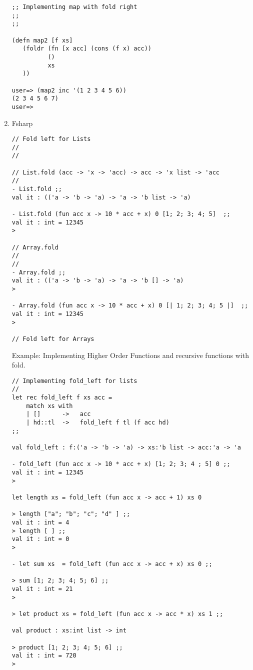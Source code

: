 \documentclass[11pt]{article}
\begin{document}
\begin{enumerate}
\begin{verbatim}
;; Implementing map with fold right 
;;
;;

(defn map2 [f xs] 
   (foldr (fn [x acc] (cons (f x) acc)) 
          ()
          xs
   ))

user=> (map2 inc '(1 2 3 4 5 6))
(2 3 4 5 6 7)
user=>
\end{verbatim}

\item Fsharp
\label{sec-1-9-4-5}

\begin{verbatim}
// Fold left for Lists 
//
//

// List.fold (acc -> 'x -> 'acc) -> acc -> 'x list -> 'acc
//
- List.fold ;;  
val it : (('a -> 'b -> 'a) -> 'a -> 'b list -> 'a) 

- List.fold (fun acc x -> 10 * acc + x) 0 [1; 2; 3; 4; 5]  ;;
val it : int = 12345
>

// Array.fold 
// 
//
- Array.fold ;;  
val it : (('a -> 'b -> 'a) -> 'a -> 'b [] -> 'a) 
> 

- Array.fold (fun acc x -> 10 * acc + x) 0 [| 1; 2; 3; 4; 5 |]  ;;
val it : int = 12345
> 

// Fold left for Arrays
\end{verbatim}


Example: Implementing Higher Order Functions and recursive functions
with fold.

\begin{verbatim}
// Implementing fold_left for lists 
//
let rec fold_left f xs acc =
    match xs with 
    | []      ->   acc 
    | hd::tl  ->   fold_left f tl (f acc hd)
;;

val fold_left : f:('a -> 'b -> 'a) -> xs:'b list -> acc:'a -> 'a

- fold_left (fun acc x -> 10 * acc + x) [1; 2; 3; 4 ; 5] 0 ;; 
val it : int = 12345
> 

let length xs = fold_left (fun acc x -> acc + 1) xs 0

> length ["a"; "b"; "c"; "d" ] ;;
val it : int = 4
> length [ ] ;;                  
val it : int = 0
> 

- let sum xs  = fold_left (fun acc x -> acc + x) xs 0 ;;

> sum [1; 2; 3; 4; 5; 6] ;;                             
val it : int = 21
> 

> let product xs = fold_left (fun acc x -> acc * x) xs 1 ;;  

val product : xs:int list -> int

> product [1; 2; 3; 4; 5; 6] ;;
val it : int = 720
> 


\end{verbatim}
\end{enumerate}
\end{document}
